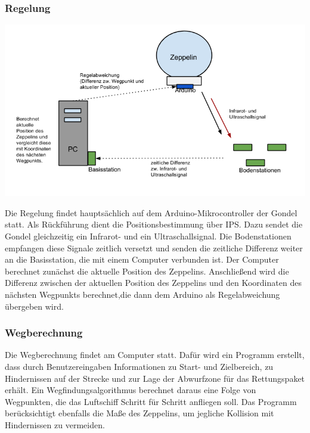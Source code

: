 \documentclass[lang=ngerman,inputenc=utf8,fontsize=10pt]{ldvarticle}
\begin{document}
\subsubsection*{Regelung}
\begin{center}
\includegraphics[width=\textwidth]{Regelung.png}
\end{center}
Die Regelung findet hauptsächlich auf dem Arduino-Mikrocontroller der Gondel statt. Als Rückführung dient die Positionsbestimmung über IPS. Dazu sendet die Gondel gleichzeitig ein Infrarot- und ein Ultraschallsignal. Die Bodenstationen empfangen diese Signale zeitlich versetzt und senden die zeitliche Differenz weiter an die Basisstation, die mit einem Computer verbunden ist. Der Computer berechnet zunächst die aktuelle Position des Zeppelins. Anschließend wird die Differenz zwischen der aktuellen Position des Zeppelins und den Koordinaten des nächsten Wegpunkts berechnet,die dann dem Arduino als Regelabweichung übergeben wird.

\subsubsection*{Wegberechnung}
Die Wegberechnung findet am Computer statt. Dafür wird ein Programm erstellt, dass durch Benutzereingaben Informationen zu Start- und Zielbereich, zu Hindernissen auf der Strecke und zur Lage der Abwurfzone für das Rettungspaket erhält. Ein Wegfindungsalgorithmus berechnet daraus eine Folge von Wegpunkten, die das Luftschiff Schritt für Schritt anfliegen soll. Das Programm berücksichtigt ebenfalls die Maße des Zeppelins, um jegliche Kollision mit Hindernissen zu vermeiden.
\end{document}
